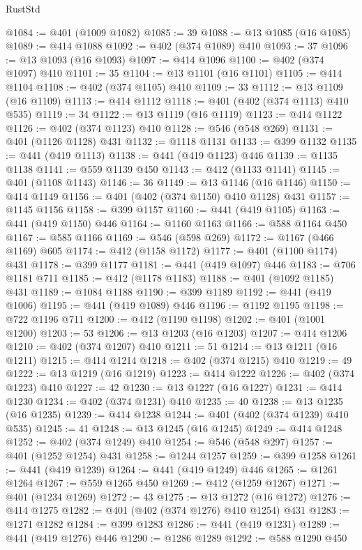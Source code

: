 \begin{lexlean}{RustStd}
\begin{coremodule}
{\begin{coremodule}
{{{{{@1084 := @401 (@1009 @1082)
@1085 := 39
@1088 := @13 @1085 (@16 @1085)
@1089 := @414 @1088
@1092 := @402 (@374 @1089) @410
@1093 := 37
@1096 := @13 @1093 (@16 @1093)
@1097 := @414 @1096
@1100 := @402 (@374 @1097) @410
@1101 := 35
@1104 := @13 @1101 (@16 @1101)
@1105 := @414 @1104
@1108 := @402 (@374 @1105) @410
@1109 := 33
@1112 := @13 @1109 (@16 @1109)
@1113 := @414 @1112
@1118 := @401 (@402 (@374 @1113) @410 @535)
@1119 := 34
@1122 := @13 @1119 (@16 @1119)
@1123 := @414 @1122
@1126 := @402 (@374 @1123) @410
@1128 := @546 (@548 @269)
@1131 := @401 (@1126 @1128) @431
@1132 := @1118 @1131
@1133 := @399 @1132
@1135 := @441 (@419 @1113)
@1138 := @441 (@419 @1123) @446
@1139 := @1135 @1138
@1141 := @559 @1139 @450
@1143 := @412 (@1133 @1141)
@1145 := @401 (@1108 @1143)
@1146 := 36
@1149 := @13 @1146 (@16 @1146)
@1150 := @414 @1149
@1156 := @401 (@402 (@374 @1150) @410 @1128) @431
@1157 := @1145 @1156
@1158 := @399 @1157
@1160 := @441 (@419 @1105)
@1163 := @441 (@419 @1150) @446
@1164 := @1160 @1163
@1166 := @588 @1164 @450
@1167 := @585 @1166
@1169 := @546 (@598 @269)
@1172 := @1167 (@466 @1169) @605
@1174 := @412 (@1158 @1172)
@1177 := @401 (@1100 @1174) @431
@1178 := @399 @1177
@1181 := @441 (@419 @1097) @446
@1183 := @706 @1181 @711
@1185 := @412 (@1178 @1183)
@1188 := @401 (@1092 @1185) @431
@1189 := @1084 @1188
@1190 := @399 @1189
@1192 := @441 (@419 @1006)
@1195 := @441 (@419 @1089) @446
@1196 := @1192 @1195
@1198 := @722 @1196 @711
@1200 := @412 (@1190 @1198)
@1202 := @401 (@1001 @1200)
@1203 := 53
@1206 := @13 @1203 (@16 @1203)
@1207 := @414 @1206
@1210 := @402 (@374 @1207) @410
@1211 := 51
@1214 := @13 @1211 (@16 @1211)
@1215 := @414 @1214
@1218 := @402 (@374 @1215) @410
@1219 := 49
@1222 := @13 @1219 (@16 @1219)
@1223 := @414 @1222
@1226 := @402 (@374 @1223) @410
@1227 := 42
@1230 := @13 @1227 (@16 @1227)
@1231 := @414 @1230
@1234 := @402 (@374 @1231) @410
@1235 := 40
@1238 := @13 @1235 (@16 @1235)
@1239 := @414 @1238
@1244 := @401 (@402 (@374 @1239) @410 @535)
@1245 := 41
@1248 := @13 @1245 (@16 @1245)
@1249 := @414 @1248
@1252 := @402 (@374 @1249) @410
@1254 := @546 (@548 @297)
@1257 := @401 (@1252 @1254) @431
@1258 := @1244 @1257
@1259 := @399 @1258
@1261 := @441 (@419 @1239)
@1264 := @441 (@419 @1249) @446
@1265 := @1261 @1264
@1267 := @559 @1265 @450
@1269 := @412 (@1259 @1267)
@1271 := @401 (@1234 @1269)
@1272 := 43
@1275 := @13 @1272 (@16 @1272)
@1276 := @414 @1275
@1282 := @401 (@402 (@374 @1276) @410 @1254) @431
@1283 := @1271 @1282
@1284 := @399 @1283
@1286 := @441 (@419 @1231)
@1289 := @441 (@419 @1276) @446
@1290 := @1286 @1289
@1292 := @588 @1290 @450
}}}}}
\end{coremodule}}
\end{coremodule}
\end{lexlean}
